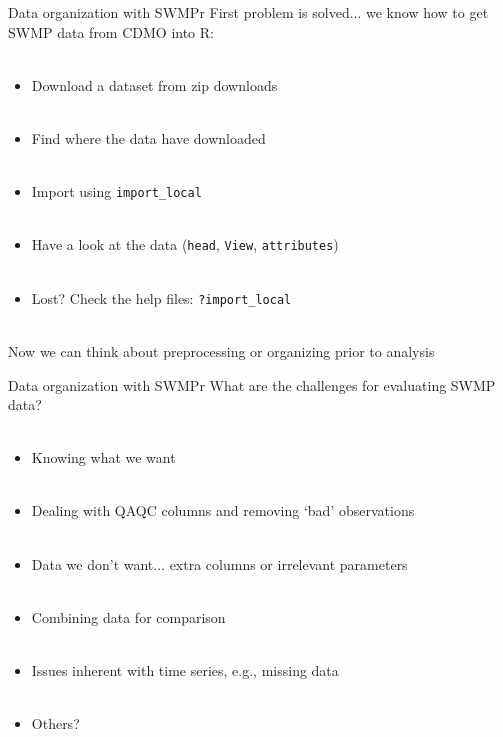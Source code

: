 \documentclass[xcolor=dvipsnames]{beamer}\usepackage[]{graphicx}\usepackage[]{color}
\begin{document}
\begin{frame}[fragile]{Data organization with SWMPr}
First problem is solved... we know how to get SWMP data from CDMO into R: \\~\\
\begin{itemize}
\item Download a dataset from zip downloads \\~\\
\item Find where the data have downloaded \\~\\
\item Import using \texttt{import_local} \\~\\
\item Have a look at the data (\texttt{head}, \texttt{View}, \texttt{attributes}) \\~\\
\item Lost? Check the help files: \texttt{?import\_local}\\~\\
\end{itemize}
Now we can think about preprocessing or organizing prior to analysis
\end{frame}

\begin{frame}[t]{Data organization with SWMPr}
\onslide<+->
What are the challenges for evaluating SWMP data? \\~\\
\onslide<+->
\begin{itemize}
\item Knowing what we want \\~\\
\item Dealing with QAQC columns and removing `bad' observations \\~\\
\item Data we don't want... extra columns or irrelevant parameters \\~\\
\item Combining data for comparison\\~\\
\item Issues inherent with time series, e.g., missing data \\~\\
\item Others?
\end{itemize}
\end{frame}
\end{document}
